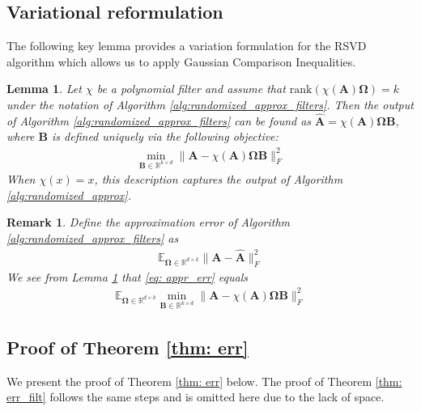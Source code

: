 \documentclass[conference]{IEEEtran}
\newtheorem{remark}{Remark}
\newtheorem{lemma}{Lemma}
\begin{document}
\subsection{Variational reformulation}
The following key lemma provides a variation formulation for the RSVD algorithm which allows us to apply Gaussian Comparison Inequalities\cite{Gordon1985SomeIF, Gordon88}. 
\begin{lemma}\label{lm: the_obj}
Let $\chi$ be a polynomial filter and assume that $\mathrm{rank}(\chi(\mathbf{A})\boldsymbol{\Omega}) = k$ under the notation of Algorithm \ref{alg:randomized_approx_filters}. Then the output of Algorithm \ref{alg:randomized_approx_filters} can be found as $\hat{\mathbf{A}} = \chi(\mathbf{A})\boldsymbol{\Omega} \mathbf{B}$, where $\mathbf{B}$ is defined uniquely via the following objective:
\begin{align*}
   \min_{\mathbf{B} \in \mathbb{R}^{k \times d}} \|\mathbf{A} - \chi(\mathbf{A})\boldsymbol{\Omega} \mathbf{B}\|_F^2
\end{align*}
When $\chi(x) = x$, this description captures the output of Algorithm \ref{alg:randomized_approx}. 
\end{lemma}


\begin{remark}
Define the approximation error of Algorithm \ref{alg:randomized_approx_filters} as
\begin{align}\label{eq: appr_err}
    \mathbb{E}_{\boldsymbol{\Omega} \in \mathbb{R}^{d \times k}} \|\mathbf{A} - \hat{\mathbf{A}}\|_F^2
\end{align}
We see from Lemma \ref{lm: the_obj} that \eqref{eq: appr_err} equals
\begin{align*}
    \mathbb{E}_{\boldsymbol{\Omega} \in \mathbb{R}^{d \times k}} \min_{\mathbf{B} \in \mathbb{R}^{k \times d}} \|\mathbf{A} - \chi(\mathbf{A})\boldsymbol{\Omega} \mathbf{B}\|_F^2
\end{align*}
\end{remark}

\subsection{Proof of Theorem \ref{thm: err} }

We present the proof of Theorem \ref{thm: err} below. The proof of Theorem \ref{thm: err_filt} follows the same steps and is omitted here due to the lack of space. 
\end{document}
